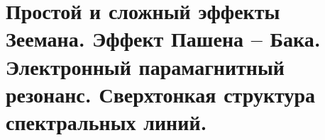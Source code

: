 \chapter{Простой и сложный эффекты Зеемана. Эффект Пашена -- Бака. 
Электронный парамагнитный резонанс. Сверхтонкая структура спектральных 
линий.}

\newpage
